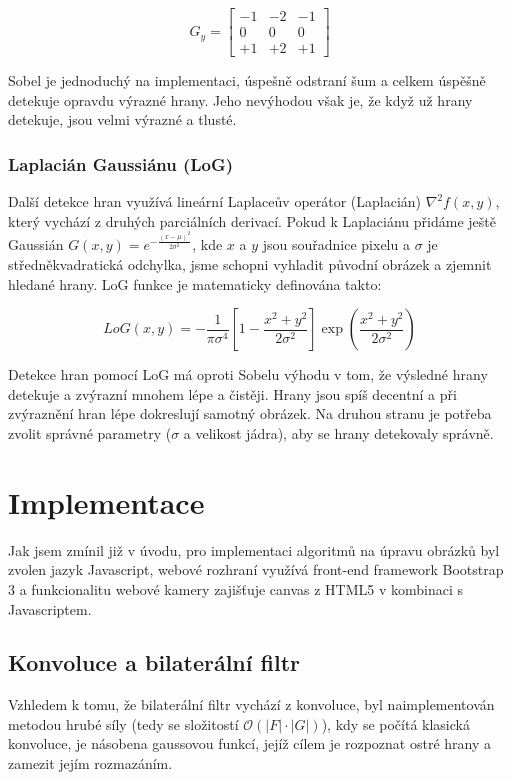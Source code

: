 \documentclass[11pt,oneside]{article}
\begin{document}
\[
G_y = \begin{bmatrix} 
-1 & -2 & -1  \\
0 & 0 & 0 \\
+1 & +2 & +1 
\end{bmatrix}
\]

Sobel je jednoduchý na implementaci, úspešně odstraní šum a celkem úspěšně detekuje opravdu výrazné hrany. Jeho nevýhodou však je, že když už hrany detekuje, jsou velmi výrazné a tlusté.

\subsubsection{Laplacián Gaussiánu (LoG)}

Další detekce hran využívá lineární Laplaceův operátor (Laplacián) $\nabla^2 f(x,y)$, který vychází z druhých parciálních derivací. Pokud k Laplaciánu přidáme ještě Gaussián $G(x,y) = e^{-\frac{(x-\mu)^2}{2\sigma^2}}$, kde $x$ a $y$ jsou souřadnice pixelu a $\sigma$ je středněkvadratická odchylka, jsme schopni vyhladit původní obrázek a zjemnit hledané hrany. LoG funkce je matematicky definována takto:

\[
LoG(x,y) = -\frac{1}{\pi \sigma^4}[1 - \frac{x^2 + y^2}{2 \sigma^2}]\exp(\frac{x^2 + y^2}{2 \sigma^2})
\]

Detekce hran pomocí LoG má oproti Sobelu výhodu v tom, že výsledné hrany detekuje a zvýrazní mnohem lépe a čistěji. Hrany jsou spíš decentní a při zvýraznění hran lépe dokreslují samotný obrázek. Na druhou stranu je potřeba zvolit správné parametry ($\sigma$ a velikost jádra), aby se hrany detekovaly správně.

\section{Implementace}
\par{Jak jsem zmínil již v úvodu, pro implementaci algoritmů na úpravu obrázků byl zvolen jazyk Javascript, webové rozhraní využívá front-end framework Bootstrap 3 a funkcionalitu webové kamery zajišťuje canvas z HTML5 v kombinaci s Javascriptem.}

\subsection{Konvoluce a bilaterální filtr}

Vzhledem k tomu, že bilaterální filtr vychází z konvoluce, byl naimplementován metodou hrubé síly (tedy se složitostí $\mathcal{O}(|F|\cdot|G|)$), kdy se počítá klasická konvoluce, je násobena gaussovou funkcí, jejíž cílem je rozpoznat ostré hrany a zamezit jejím rozmazáním.
\end{document}

